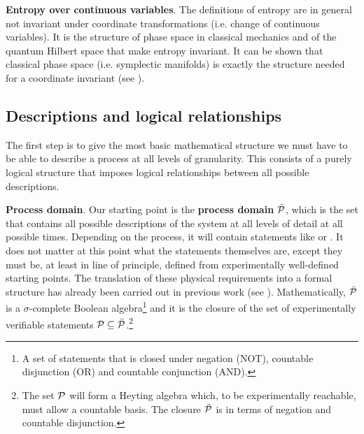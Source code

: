 \documentclass[10pt, onecolumn, longbibliography, nofootinbib]{revtex4-2}
\begin{document}
\textbf{Entropy over continuous variables}. The definitions of entropy are in general not invariant under coordinate transformations (i.e. change of continuous variables). It is the structure of phase space in classical mechanics and of the quantum Hilbert space that make entropy invariant. It can be shown that classical phase space (i.e. symplectic manifolds) is exactly the structure needed for a coordinate invariant (see \cite{aop-phil-Hamiltonianinformation}).


\subsection{Descriptions and logical relationships}

The first step is to give the most basic mathematical structure we must have to be able to describe a process at all levels of granularity. This consists of a purely logical structure that imposes logical relationships between all possible descriptions.

\textbf{Process domain}. Our starting point is the \textbf{process domain} $\tdomain[P]$, which is the set that contains all possible descriptions of the system at all levels of detail at all possible times. Depending on the process, it will contain statements like  or . It does not matter at this point what the statements themselves are, except they must be, at least in line of principle, defined from experimentally well-defined starting points. The translation of these physical requirements into a formal structure has already been carried out in previous work (see \cite{aop-book}). Mathematically, $\tdomain[P]$ is a $\sigma$-complete Boolean algebra\footnote{A set of statements that is closed under negation (NOT), countable disjunction (OR) and countable conjunction (AND).} and it is the closure of the set of experimentally verifiable statements $\edomain[P] \subseteq \tdomain[P]$.\footnote{The set $\edomain[P]$ will form a Heyting algebra which, to be experimentally reachable, must allow a countable basis. The closure $\tdomain[P]$ is in terms of negation and countable disjunction.}
\end{document}
